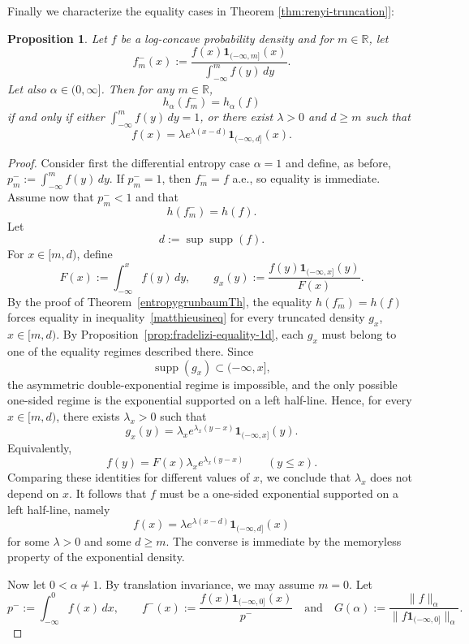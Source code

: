 \documentclass{article}
\theoremstyle{plain}
\newtheorem{proposition}[theorem]{Proposition}
\theoremstyle{definition}
\newcommand{\RL}{\mathbb{R}}
\newcommand{\1}{\mathbf 1}
\begin{document}

Finally we characterize the equality cases in Theorem \ref{thm:renyi-truncation}]:
\begin{proposition}
\label{cor:renyi-truncation-equality}
Let $f$ be a log-concave probability density and for $m \in \RL$, let 
\[
f_{m}^-(x):=\frac{f(x)\mathbf 1_{(-\infty,m]}(x)}{\int_{-\infty}^{m} f(y)\,dy}.
\]
Let also $\alpha\in(0,\infty]$. Then for any $m \in \RL$,
\[
h_\alpha(f_m^-)=h_\alpha(f)
\]
if and only if either $\int_{-\infty}^{m} f(y)\,dy =1$, or there exist $\lambda>0$ and $d\ge m$ such that
\[
f(x)=\lambda e^{\lambda(x-d)}\mathbf 1_{(-\infty,d]}(x).
\]
\end{proposition}

\begin{proof}
Consider first the differential entropy case $\alpha =1$ and define, as before, $p_m^- := \int_{-\infty}^{m} f(y)\,dy$. If $p_m^{-}=1$, then $f_m^-=f$ a.e., so equality is immediate. Assume now that $p_m^{-}<1$ and that
\[
h(f_m^-)=h(f).
\]
Let
\[
d:=\sup\operatorname{supp}(f).
\]
For $x\in[m,d)$, define
\[
F(x):=\int_{-\infty}^x f(y)\,dy,
\qquad
g_x(y):=\frac{f(y)\mathbf 1_{(-\infty,x]}(y)}{F(x)}.
\]
By the proof of Theorem~\ref{entropygrunbaumTh}, the equality $h(f_m^-)=h(f)$ forces equality in   
inequality~\eqref{matthieusineq}
for every truncated density $g_x$, $x\in[m,d)$. 
By Proposition~\ref{prop:fradelizi-equality-1d}, each $g_x$ must belong to one of the equality regimes described there. Since
\[
\operatorname{supp}(g_x)\subset(-\infty,x],
\]
the asymmetric double-exponential regime is impossible, and the only possible
one-sided regime is the exponential supported on a left half-line. Hence, for every $x\in[m,d)$, there exists $\lambda_x>0$ such that
\[
g_x(y)=\lambda_x e^{\lambda_x(y-x)}\mathbf 1_{(-\infty,x]}(y).
\]
Equivalently,
\[
f(y)=F(x)\lambda_x e^{\lambda_x(y-x)}
\qquad (y\le x).
\]
Comparing these identities for different values of $x$, we conclude that $\lambda_x$ does not depend on $x$. It follows that $f$ must be a one-sided exponential supported on a left half-line, namely
\[
f(x)=\lambda e^{\lambda(x-d)}\mathbf 1_{(-\infty,d]}(x)
\]
for some $\lambda>0$ and some $d\ge m$. The converse is immediate by the memoryless property of the exponential density.

Now let $0<\alpha \neq 1$. By translation invariance, we may assume $m=0$. Let
\[
p^{-}:=\int_{-\infty}^0 f(x)\,dx,
\qquad
f^-(x):=\frac{f(x)\mathbf 1_{(-\infty,0]}(x)}{p^{-}}
\quad \text{and} \quad  
G(\alpha):=\frac{\|f\|_\alpha}{\|f\mathbf 1_{(-\infty,0]}\|_\alpha}.
\]



\end{proof}
\end{document}
